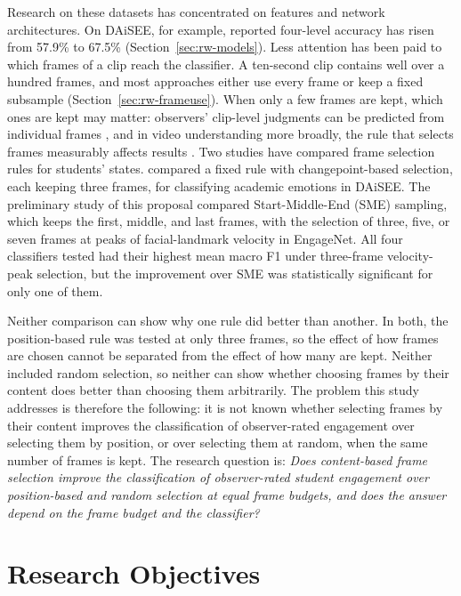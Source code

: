 Research on these datasets has concentrated on features and network architectures. On DAiSEE, for example, reported four-level accuracy has risen from 57.9\% to 67.5\% (Section~\ref{sec:rw-models}). Less attention has been paid to which frames of a clip reach the classifier. A ten-second clip contains well over a hundred frames, and most approaches either use every frame or keep a fixed subsample (Section~\ref{sec:rw-frameuse}). When only a few frames are kept, which ones are kept may matter: observers' clip-level judgments can be predicted from individual frames \cite{whitehill2014}, and in video understanding more broadly, the rule that selects frames measurably affects results \cite{korbar2019,brkic2025}. Two studies have compared frame selection rules for students' states.  compared a fixed rule with changepoint-based selection, each keeping three frames, for classifying academic emotions in DAiSEE. The preliminary study of this proposal \cite{sityar2026icce} compared Start-Middle-End (SME) sampling, which keeps the first, middle, and last frames, with the selection of three, five, or seven frames at peaks of facial-landmark velocity in EngageNet. All four classifiers tested had their highest mean macro F1 under three-frame velocity-peak selection, but the improvement over SME was statistically significant for only one of them.

Neither comparison can show why one rule did better than another. In both, the position-based rule was tested at only three frames, so the effect of how frames are chosen cannot be separated from the effect of how many are kept. Neither included random selection, so neither can show whether choosing frames by their content does better than choosing them arbitrarily. The problem this study addresses is therefore the following: it is not known whether selecting frames by their content improves the classification of observer-rated engagement over selecting them by position, or over selecting them at random, when the same number of frames is kept. The research question is: \emph{Does content-based frame selection improve the classification of observer-rated student engagement over position-based and random selection at equal frame budgets, and does the answer depend on the frame budget and the classifier?}



\section{Research Objectives}
\label{sec:objectives}

